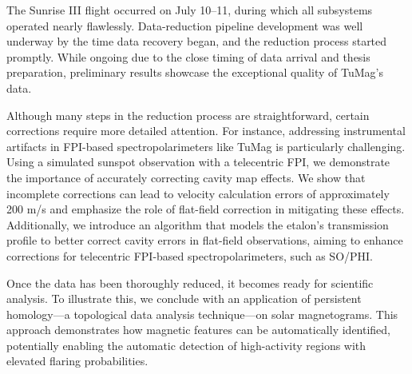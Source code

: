 \documentclass[12pt]{mythesis}
\begin{document}
The Sunrise III flight occurred on July 10–11, during which all subsystems operated nearly flawlessly. Data-reduction pipeline development was well underway by the time data recovery began, and the reduction process started promptly. While ongoing due to the close timing of data arrival and thesis preparation, preliminary results showcase the exceptional quality of TuMag’s data.

Although many steps in the reduction process are straightforward, certain corrections require more detailed attention. For instance, addressing instrumental artifacts in FPI-based spectropolarimeters like TuMag is particularly challenging. Using a simulated sunspot observation with a telecentric FPI, we demonstrate the importance of accurately correcting cavity map effects. We show that incomplete corrections can lead to velocity calculation errors of approximately 200 m/s and emphasize the role of flat-field correction in mitigating these effects. Additionally, we introduce an algorithm that models the etalon's transmission profile to better correct cavity errors in flat-field observations, aiming to enhance corrections for telecentric FPI-based spectropolarimeters, such as SO/PHI.

Once the data has been thoroughly reduced, it becomes ready for scientific analysis. To illustrate this, we conclude with an application of persistent homology—a topological data analysis technique—on solar magnetograms. This approach demonstrates how magnetic features can be automatically identified, potentially enabling the automatic detection of high-activity regions with elevated flaring probabilities.

\tableofcontents
\listoffigures

\mainmatter %
















\cleardoublepage
\layout
\end{document}
